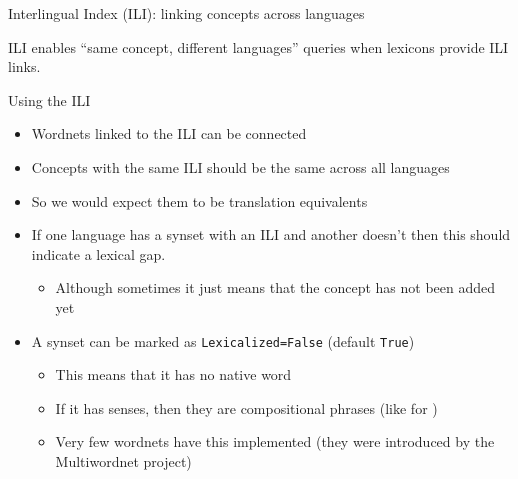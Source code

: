\documentclass[aspectratio=169]{beamer}
\newcommand{\avmtype}{\scriptsize\itshape\color{black!70}\raggedright}
\newcommand{\avmcontent}{\small}
\newcommand{\avmnode}[4][]{%
  \node[#2, #1] (#3) {%
    {\avmtype #2}\\
    {\avmcontent \shortstack{#4}}%
  };
}
\begin{document}
\begin{frame}{Interlingual Index (ILI): linking concepts across languages}
\centering
{}

\smallskip
\small
ILI enables “same concept, different languages” queries when lexicons provide ILI links.
\end{frame}


\begin{frame}{Using the ILI} 

  \begin{itemize}
  \item Wordnets linked to the ILI can be connected
  \item Concepts with the same ILI should be the same across all languages
  \item So we would expect them to be translation equivalents
  \item If one language has a synset with an ILI and another doesn't then this should indicate a lexical gap.
    \begin{itemize}
    \item Although sometimes it just means that the concept has not been added yet
    \end{itemize}
  \item A synset can be marked as \texttt{Lexicalized=False}  (default \texttt{True})
    \begin{itemize}
    \item This means that it has no native word
    \item If it has senses, then they are compositional phrases (like   for )
    \item Very few wordnets have this implemented (they were introduced by the Multiwordnet project)
    \end{itemize}
  \end{itemize}
  
\end{frame}
\end{document}
